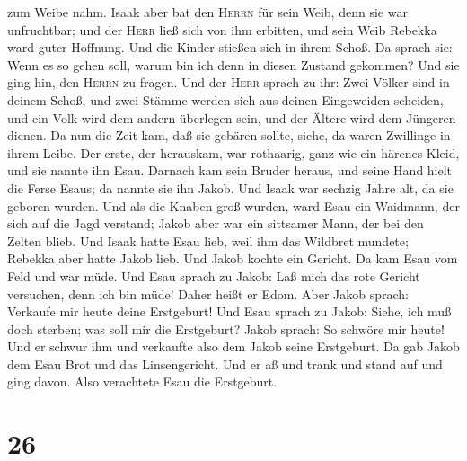 zum Weibe nahm.  Isaak aber bat den \textsc{Herrn} für
sein Weib, denn sie war unfruchtbar; und der \textsc{Herr} ließ sich von
ihm erbitten, und sein Weib Rebekka ward guter Hoffnung. 
Und die Kinder stießen sich in ihrem Schoß. Da sprach sie: Wenn es so
gehen soll, warum bin ich denn in diesen Zustand gekommen? Und sie ging
hin, den \textsc{Herrn} zu fragen.  Und der \textsc{Herr}
sprach zu ihr: Zwei Völker sind in deinem Schoß, und zwei Stämme werden
sich aus deinen Eingeweiden scheiden, und ein Volk wird dem andern
überlegen sein, und der Ältere wird dem Jüngeren dienen. 
Da nun die Zeit kam, daß sie gebären sollte, siehe, da waren Zwillinge
in ihrem Leibe.  Der erste, der herauskam, war rothaarig,
ganz wie ein härenes Kleid, und sie nannte ihn Esau. 
Darnach kam sein Bruder heraus, und seine Hand hielt die Ferse Esaus; da
nannte sie ihn Jakob. Und Isaak war sechzig Jahre alt, da sie geboren
wurden.  Und als die Knaben groß wurden, ward Esau ein
Waidmann, der sich auf die Jagd verstand; Jakob aber war ein sittsamer
Mann, der bei den Zelten blieb.  Und Isaak hatte Esau
lieb, weil ihm das Wildbret mundete; Rebekka aber hatte Jakob lieb.
 Und Jakob kochte ein Gericht. Da kam Esau vom Feld und
war müde.  Und Esau sprach zu Jakob: Laß mich das rote
Gericht versuchen, denn ich bin müde! Daher heißt er Edom.
 Aber Jakob sprach: Verkaufe mir heute deine Erstgeburt!
 Und Esau sprach zu Jakob: Siehe, ich muß doch sterben;
was soll mir die Erstgeburt?  Jakob sprach: So schwöre
mir heute! Und er schwur ihm und verkaufte also dem Jakob seine
Erstgeburt.  Da gab Jakob dem Esau Brot und das
Linsengericht. Und er aß und trank und stand auf und ging davon. Also
verachtete Esau die Erstgeburt.

\hypertarget{section-25}{%
\section{26}\label{section-25}}

